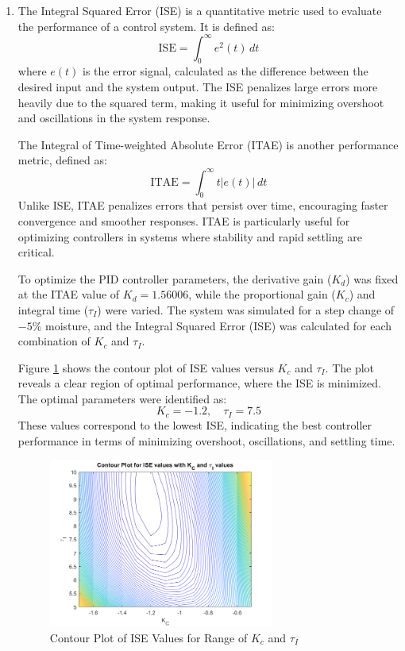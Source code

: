 \documentclass[12pt]{article}
\begin{document}
\begin{enumerate}
\begin{enumerate}
    \item
    The Integral Squared Error (ISE) is a quantitative metric used to evaluate the performance of a control system. It is defined as:
    \[
    \text{ISE} = \int_0^\infty e^2(t) \, dt
    \]
    where \( e(t) \) is the error signal, calculated as the difference between the desired input and the system output. The ISE penalizes large errors more heavily due to the squared term, making it useful for minimizing overshoot and oscillations in the system response.

    The Integral of Time-weighted Absolute Error (ITAE) is another performance metric, defined as:
    \[
    \text{ITAE} = \int_0^\infty t |e(t)| \, dt
    \]
    Unlike ISE, ITAE penalizes errors that persist over time, encouraging faster convergence and smoother responses. ITAE is particularly useful for optimizing controllers in systems where stability and rapid settling are critical.

    To optimize the PID controller parameters, the derivative gain (\( K_d \)) was fixed at the ITAE value of \( K_d = 1.56006 \), while the proportional gain (\( K_c \)) and integral time (\( \tau_I \)) were varied. The system was simulated for a step change of \(-5\%\) moisture, and the Integral Squared Error (ISE) was calculated for each combination of \( K_c \) and \( \tau_I \).

    Figure \ref{fig:figure2_4a} shows the contour plot of ISE values versus \( K_c \) and \( \tau_I \). The plot reveals a clear region of optimal performance, where the ISE is minimized. The optimal parameters were identified as:
    \[
    K_c = -1.2, \quad \tau_I = 7.5
    \]
    These values correspond to the lowest ISE, indicating the best controller performance in terms of minimizing overshoot, oscillations, and settling time.

    \begin{figure}[H]
      \centering
      \includegraphics[width=0.7\textwidth]{Figures/figure2-4a.png}
      \caption{Contour Plot of ISE Values for Range of \( K_c \) and \( \tau_I \)}
      \label{fig:figure2_4a}
    \end{figure}


\end{enumerate}
\end{enumerate}
\end{document}
